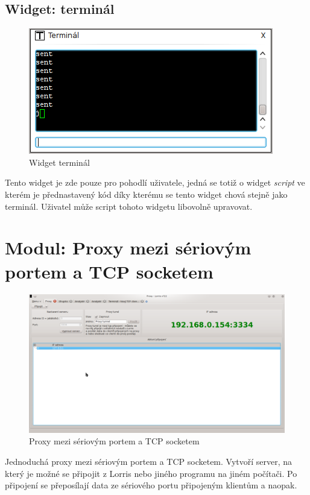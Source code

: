 \documentclass[12pt, a4paper, oneside]{article}
\newcommand{\It}{\textit}  %
\begin{document}
\subsection{Widget: terminál}
\begin{figure}[H]
\begin{center}
\includegraphics[scale=0.70]{img/w_terminal.png}
\caption{Widget terminál}
\end{center}
\end{figure}
Tento widget je zde pouze pro pohodlí uživatele, jedná se totiž o widget \It{script} ve kterém je přednastavený kód díky kterému se tento widget chová stejně jako terminál. Uživatel může script tohoto widgetu libovolně upravovat.

\newpage
\setlength{\voffset}{0mm} %
\pagestyle{plain}
\section{Modul: Proxy mezi sériovým portem a TCP socketem}
\begin{figure}[H]
\begin{center}
\includegraphics[width=\textwidth]{img/proxy.png}
\caption{Proxy mezi sériovým portem a TCP socketem}
\label{Shupito}
\end{center}
\end{figure}
Jednoduchá proxy mezi sériovým portem a TCP socketem. Vytvoří server, na který je možné se připojit z Lorris nebo jiného programu na jiném počítači. Po připojení se přeposílají data ze sériového portu připojeným klientům a naopak.
\end{document}
